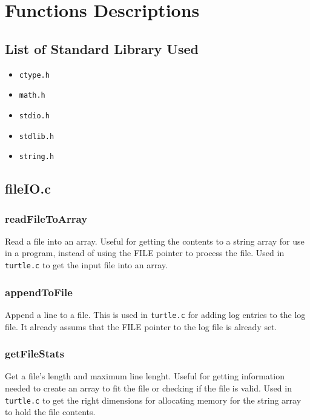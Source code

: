 \documentclass[a4paper, 12pt, titlepage]{article}
\newcommand{\code}[1]{\small\texttt{#1}\normalsize}
\begin{document}
\newpage


\section{Functions Descriptions}

\subsection{List of Standard Library Used}

\begin{itemize}[label={--}]
    \item \code{ctype.h}
    \item \code{math.h}
    \item \code{stdio.h}
    \item \code{stdlib.h}
    \item \code{string.h}
\end{itemize}

\subsection{fileIO.c}
\subsubsection{readFileToArray}

Read a file into an array. Useful for getting the contents to a string 
array for use in a program, instead of using the FILE pointer to process 
the file. Used in \code{turtle.c} to get the input file into an array.

\subsubsection{appendToFile}

Append a line to a file. This is used in \code{turtle.c} for adding log 
entries to the log file. It already assums that the FILE pointer to the 
log file is already set.

\subsubsection{getFileStats}

Get a file's length and maximum line lenght. Useful for getting information 
needed to create an array to fit the file or checking if the file is valid. 
Used in \code{turtle.c} to get the right dimensions for allocating memory 
for the string array to hold the file contents.
\end{document}
